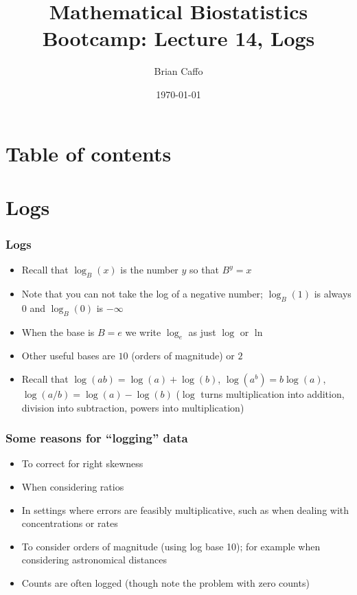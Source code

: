 \documentclass[aspectratio=169]{beamer}
\title{Mathematical Biostatistics Bootcamp: Lecture 14, Logs}
\author{Brian Caffo}
\date{\today}
\institute[Department of Biostatistics]{
  Department of Biostatistics \\
  Johns Hopkins Bloomberg School of Public Health\\
  Johns Hopkins University
}
\begin{document}
\frame{\titlepage}


\section{Table of contents}

\section{Logs}
\begin{frame}\frametitle{Logs}
\begin{itemize}
\item Recall that $\log_B(x)$ is the number
  $y$ so that $B^y = x$
\item Note that you can not take the log of a negative
  number; $\log_B(1)$ is always 0 and $\log_B(0)$ is $-\infty$
\item When the base is $B = e$  we
  write $\log_e$ as just $\log$ or $\ln$
\item Other useful bases are $10$ (orders of magnitude) or $2$
\item Recall that $\log(ab) = \log(a) + \log(b)$, $\log(a^b) = b\log(a)$,
  $\log(a/b) = \log(a) - \log(b)$ ($\log$ turns multiplication into addition,
  division into subtraction, powers into multiplication)
\end{itemize}
\end{frame}

\begin{frame}\frametitle{Some reasons for ``logging'' data}
\begin{itemize}
\item To correct for right skewness 
\item When considering ratios
\item In settings where errors are feasibly multiplicative, such as
  when dealing with concentrations or rates
\item To consider orders of magnitude (using log base 10); for example
  when considering astronomical distances
\item Counts are often logged (though note the problem with zero counts)
\end{itemize}
\end{frame}
\end{document}
